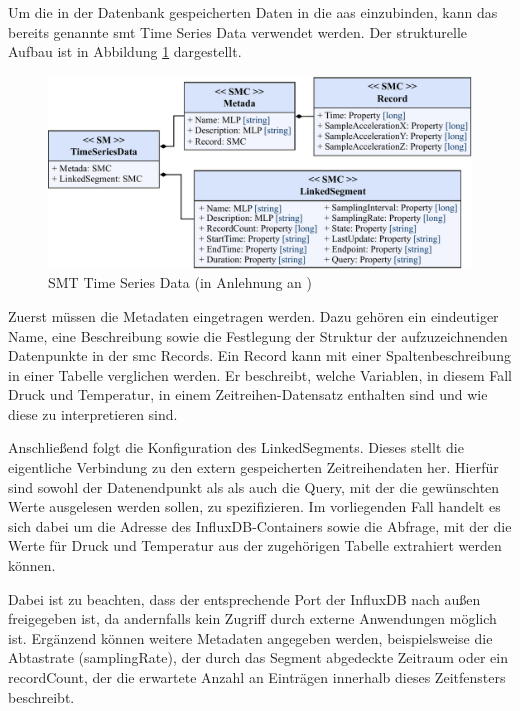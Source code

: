 Um die in der Datenbank gespeicherten Daten in die \acs{aas} einzubinden, kann das bereits genannte \acs{smt} Time Series Data verwendet werden.
Der strukturelle Aufbau ist in Abbildung \ref{fig:SMTTimeSeriesData} dargestellt.

\begin{figure}[htbp]
    \centering
    \includegraphics[width=1\textwidth]{Bilder/TimeSeries/SM_TimeSeriesData.pdf}
    \caption[SMT Time Series Data]{SMT Time Series Data (in Anlehnung an \cite{SpezifikationTimeSeriesData})}
    \label{fig:SMTTimeSeriesData}
\end{figure}

Zuerst müssen die Metadaten eingetragen werden. 
Dazu gehören ein eindeutiger Name, eine Beschreibung sowie die Festlegung der Struktur der aufzuzeichnenden Datenpunkte in der \acs{smc} Records.
Ein Record kann mit einer Spaltenbeschreibung in einer Tabelle verglichen werden.
Er beschreibt, welche Variablen, in diesem Fall Druck und Temperatur, in einem Zeitreihen-Datensatz enthalten sind und wie diese zu interpretieren sind.

Anschließend folgt die Konfiguration des LinkedSegments. 
Dieses stellt die eigentliche Verbindung zu den extern gespeicherten Zeitreihendaten her.
Hierfür sind sowohl der Datenendpunkt als als auch die Query, mit der die gewünschten Werte ausgelesen werden sollen, zu spezifizieren.
Im vorliegenden Fall handelt es sich dabei um die Adresse des InfluxDB-Containers sowie die Abfrage, mit der die Werte für Druck und Temperatur aus der zugehörigen Tabelle extrahiert werden können.

Dabei ist zu beachten, dass der entsprechende Port der InfluxDB nach außen freigegeben ist, da andernfalls kein Zugriff durch externe Anwendungen möglich ist.
Ergänzend können weitere Metadaten angegeben werden, beispielsweise die Abtastrate (samplingRate), der durch das Segment abgedeckte Zeitraum oder ein recordCount, der die erwartete Anzahl an Einträgen innerhalb dieses Zeitfensters beschreibt.

